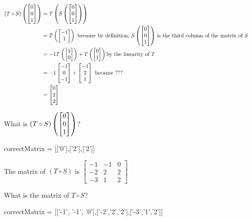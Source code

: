 \documentclass{ximera}
\begin{document}
\begin{question}
\begin{solution}
\begin{hint}
\begin{question}
	\end{question}
	\begin{question}
		\begin{solution}
		\begin{hint}
			\begin{align*}
				(T \circ S)\left(\begin{bmatrix}0\\0\\1\end{bmatrix}\right) &= T\left(S\left(\begin{bmatrix}0\\0\\1\end{bmatrix}\right)\right)\\
				&= T\left(\begin{bmatrix}-1\\1\end{bmatrix}\right) \text{ because by definition, $S\left(\begin{bmatrix}0\\0\\1\end{bmatrix}\right)$ is the third column of the matrix of $S$}\\
				&=-1T\left(\begin{bmatrix}1\\0\end{bmatrix}\right) + T\left(\begin{bmatrix}0\\1\end{bmatrix}\right) \text{by the linearity of $T$}\\
				&=-1\begin{bmatrix}-1\\0\\-1\end{bmatrix}+\begin{bmatrix}-1\\2\\1\end{bmatrix} \text{ because ???}\\
				&=\begin{bmatrix}0\\2\\2\end{bmatrix}
			\end{align*}
		\end{hint}
		What is  $(T \circ S)\left(\begin{bmatrix}0\\0\\1\end{bmatrix}\right)$?
			\begin{matrix-answer}[name=M]
 			   correctMatrix = [['0'],['2'],['2']]
 			 \end{matrix-answer}
		\end{solution}
		
	\end{question}
	
	
\end{hint}
\begin{hint}
	The matrix of $(T \circ S)$ is $\begin{bmatrix} -1 & -1 & 0\\-2 & 2&2\\-3&1&2 \end{bmatrix}$
\end{hint}
  What is the matrix of $T \circ S$?

  \begin{matrix-answer}[name=M]
    correctMatrix = [['-1', '-1', '0'],['-2','2','2'],['-3','1','2']]
  \end{matrix-answer}
\end{solution}

\end{question}
	
\end{document}

